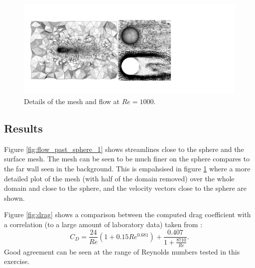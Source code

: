 \begin{figure}
\centering
\includegraphics[width=15cm,clip]{examples_images/flow_past_sphere/sphere-Re1000-combined.pdf}
\caption{Details of the mesh and flow at $Re=1000$.}
\label{fig:flow_past_sphere_2}
\end{figure}

\subsection{Results}
Figure \ref{fig:flow_past_sphere_1} shows streamlines close to the sphere and the surface mesh.
The mesh can be seen to be much finer on the sphere compares to the far wall seen in the background.
This is empahsised in figure \ref{fig:flow_past_sphere_2} where a more detailed plot of the mesh (with
half of the domain removed) over the whole domain and close to the sphere, and the velocity vectors
close to the sphere are shown.

Figure \ref{fig:drag} shows a comparison between the computed drag coefficient with
a correlation (to a large amount of laboratory data) taken from \citet{brown2003}:
\begin{equation}
C_D = \frac{24}{Re}\left(1+0.15Re^{0.681}\right) + \frac{0.407}{1+\frac{8710}{Re}}.
\label{eqn:sphere_drag_corr}
\end{equation}
Good agreement can be seen at the range of Reynolds numbers tested in this exercise.


